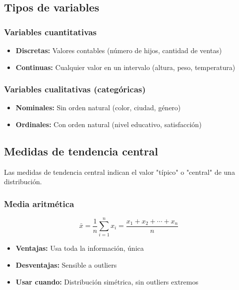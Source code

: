 \documentclass[a4paper,11pt]{article}
\begin{document}
\subsection{Tipos de variables}

\subsubsection{Variables cuantitativas}

\begin{itemize}
    \item \textbf{Discretas:} Valores contables (número de hijos, cantidad de ventas)
    \item \textbf{Continuas:} Cualquier valor en un intervalo (altura, peso, temperatura)
\end{itemize}

\subsubsection{Variables cualitativas (categóricas)}

\begin{itemize}
    \item \textbf{Nominales:} Sin orden natural (color, ciudad, género)
    \item \textbf{Ordinales:} Con orden natural (nivel educativo, satisfacción)
\end{itemize}

\subsection{Medidas de tendencia central}

Las medidas de tendencia central indican el valor "típico" o "central" de una distribución.

\subsubsection{Media aritmética}

$$\bar{x} = \frac{1}{n}\sum_{i=1}^{n} x_i = \frac{x_1 + x_2 + \cdots + x_n}{n}$$

\begin{itemize}
    \item \textbf{Ventajas:} Usa toda la información, única
    \item \textbf{Desventajas:} Sensible a outliers
    \item \textbf{Usar cuando:} Distribución simétrica, sin outliers extremos
\end{itemize}
\end{document}
